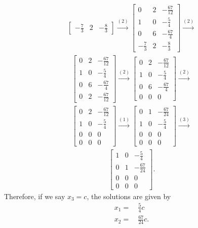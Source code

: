 \documentclass[12pt]{article}
\begin{document}
\begin{enumerate}
\begin{align*}
\begin{bmatrix}
        -\frac{7}{3} & 2 & -\frac{8}{3}
      \end{bmatrix}
      \xrightarrow{(2)}
      \begin{bmatrix}
        0            & 2 & -\frac{67}{12}\\
        1            & 0 & -\frac{5}{4}  \\
        0            & 6 & -\frac{67}{4} \\
        -\frac{7}{3} & 2 & -\frac{8}{3}
      \end{bmatrix}
      \xrightarrow{(2)}
    \end{align*}
    \begin{align*}
      \begin{bmatrix}
        0 & 2 & -\frac{67}{12}\\
        1 & 0 & -\frac{5}{4}  \\
        0 & 6 & -\frac{67}{4} \\
        0 & 2 & -\frac{67}{12}
      \end{bmatrix}
      \xrightarrow{(2)}
      \begin{bmatrix}
        0 & 2 & -\frac{67}{12}\\
        1 & 0 & -\frac{5}{4}  \\
        0 & 6 & -\frac{67}{4} \\
        0 & 0 & 0
      \end{bmatrix}
      \xrightarrow{(2)}
    \end{align*}
    \begin{align*}
      \begin{bmatrix}
        0 & 2 & -\frac{67}{12}\\
        1 & 0 & -\frac{5}{4}  \\
        0 & 0 & 0             \\
        0 & 0 & 0
      \end{bmatrix}
      \xrightarrow{(1)}
      \begin{bmatrix}
        0 & 1 & -\frac{67}{24}\\
        1 & 0 & -\frac{5}{4}  \\
        0 & 0 & 0             \\
        0 & 0 & 0
      \end{bmatrix}
      \xrightarrow{(3)}
    \end{align*}
    \begin{align*}
      \begin{bmatrix}
        1 & 0 & -\frac{5}{4}  \\
        0 & 1 & -\frac{67}{24}\\
        0 & 0 & 0             \\
        0 & 0 & 0
      \end{bmatrix}.
    \end{align*}
    Therefore, if we say $x_3 = c$, the solutions are given by
    \begin{align*}
      x_1 =&\ \frac{5}{4}c\\
      x_2 =&\ \frac{67}{24}c.
    \end{align*}
\end{enumerate}
\end{document}

